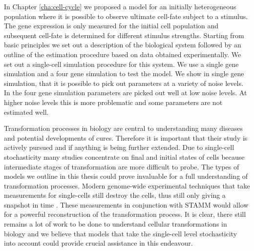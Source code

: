 In Chapter \ref{cha:cell-cycle} we proposed a model for an initially heterogeneous population where it is possible to observe ultimate cell-fate subject to a stimulus. The gene expression is only measured for the initial cell population and subsequent cell-fate is determined for different stimulus strengths. Starting from basic principles we set out a description of the biological system followed by an outline of the estimation procedure based on data obtained experimentally. We set out a single-cell simulation procedure for this system. We use a single gene simulation and a four gene simulation to test the model. We show in single gene simulation, that it is possible to pick out parameters at a variety of noise levels. In the four gene simulation parameters are picked out well at low noise levels. At higher noise levels this is more problematic and some parameters are not estimated well.

Transformation processes in biology are central to understanding many diseases and potential developments of cures. Therefore it is important that their study is actively pursued and if anything is being further extended. Due to single-cell stochasticity many studies concentrate on final and initial states of cells because intermediate stages of transformation are more difficult to probe. The types of models we outline in this thesis could prove invaluable for a full understanding of transformation processes. Modern genome-wide experimental techniques that take measurements for single-cells still destroy the cells, thus still only giving a snapshot in time \citep{deSouza:2012dz}. These measurements in conjunction with STAMM would allow for a powerful reconstruction of the transformation process. It is clear, there still remains a lot of work to be done to understand cellular transformations in biology and we believe that models that take the single-cell level stochasticity into account could provide crucial assistance in this endeavour.

